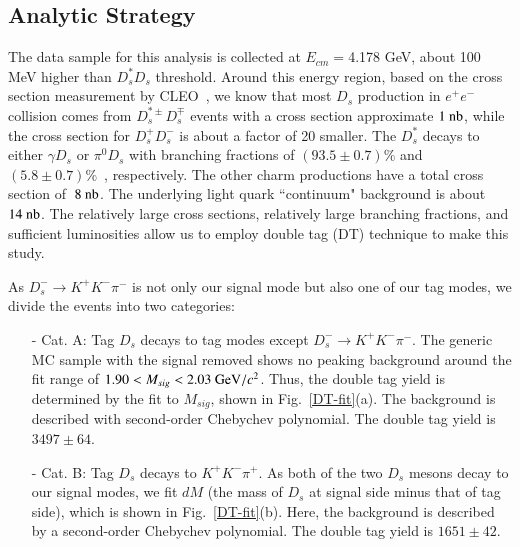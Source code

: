 \par{
    \subsection{Analytic Strategy}
    The data sample for this analysis is collected at $E_{cm}=$4.178 GeV, about 100 MeV higher than $D_{s}^{*}D_{s}$ threshold. Around this energy region, based on the cross section measurement by CLEO~\cite{PRD80-072001}, we know that most $D_{s}$ production in $e^{+}e^{-}$ collision comes from $D_{s}^{*\pm}D_{s}^{\mp}$ events with a cross section approximate $1\ {\rm nb}$, while the cross section for $D_{s}^{+}D_{s}^{-}$ is about a factor of 20 smaller.
    The $D_{s}^{*}$ decays to either $\gamma D_{s}$ or $\pi^{0}D_{s}$ with branching fractions of $(93.5\pm0.7)\%$ and $(5.8\pm0.7)\%$~\cite{PDG2018}, respectively. 
    The other charm productions have a total cross section of $~8\ {\rm nb}$.
    The underlying light quark ``continuum" background is about $14\ {\rm nb}$. 
    The relatively large cross sections, relatively large branching fractions, and sufficient luminosities allow us to employ double tag (DT) technique to make this study.

    As $D_{s}^{-} \rightarrow K^{+}K^{-}\pi^{-}$ is not only our signal mode but also one of our tag modes, we divide the events into two categories:

    \begin{itemize}
        \item[-] Cat. A: Tag $D_{s}$ decays to tag modes except $D_{s}^{-} \rightarrow K^{+}K^{-}\pi^{-}$. The generic MC sample with the signal removed shows no peaking background around the fit range of $1.90 < M_{sig} < 2.03 \ {\rm GeV}/c^{2}$.
            Thus, the double tag yield is determined by the fit to $M_{sig}$, shown in Fig.~\ref{DT-fit}(a). The background is described with second-order Chebychev polynomial. The double tag yield is $3497\pm64$. 
        \item[-] Cat. B: Tag $D_{s}$ decays to $K^{+}K^{-}\pi^{+}$. As both of the two $D_{s}$ mesons decay to our signal modes, we fit $dM$ (the mass of $D_{s}$ at signal side minus that of tag side), which is shown in Fig.~\ref{DT-fit}(b). 
            Here, the background is described by a second-order Chebychev polynomial. The double tag yield is $1651\pm42$. 
    \end{itemize}

}
